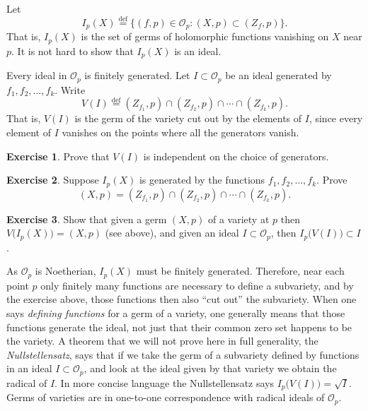 \documentclass[12pt,openany]{book}
\newcommand{\sO}{{\mathscr{O}}}
\newcommand{\myindex}[1]{#1\index{#1}}
\theoremstyle{plain}
\theoremstyle{remark}
\theoremstyle{definition}
\newenvironment{exbox}{%
    \def\FrameCommand{\vrule width 1pt \relax\hspace {10pt}}%
    \MakeFramed {\advance \hsize -\width \FrameRestore }%
}{%
    \endMakeFramed
}
\theoremstyle{exercise}
\newtheorem{exercise}{Exercise}[section]
\theoremstyle{example}
\begin{document}
Let
%
\begin{equation*}
I_p(X) \overset{\text{def}}{=}
\bigl\{ (f,p) \in \sO_p : (X,p) \subset (Z_f,p) \bigr\} .
\end{equation*}
That is, $I_p(X)$ is the set of germs of holomorphic functions vanishing on
$X$ near $p$.  It is not hard to show that $I_p(X)$ is an ideal.

Every ideal in $\sO_p$ is finitely generated.
Let $I \subset \sO_p$ be an ideal generated by $f_1,f_2,\ldots,f_k$.
Write
%
\begin{equation*}
V(I) \overset{\text{def}}{=}
(Z_{f_1},p) \cap (Z_{f_2},p) \cap \cdots \cap (Z_{f_k},p) .
\end{equation*}
That is, $V(I)$ is the germ of the variety cut out by the elements of $I$,
since every
element of $I$ vanishes on the points where all the generators vanish.

\begin{exbox}
\begin{exercise}
Prove that $V(I)$ is independent on the choice of generators.
\end{exercise}

\begin{exercise}
Suppose $I_p(X)$ is generated by the functions $f_1, f_2, \ldots, f_k$.
Prove 
\begin{equation*}
(X,p) = (Z_{f_1},p) \cap (Z_{f_2},p) \cap \cdots \cap (Z_{f_k},p) .
\end{equation*}
\end{exercise}

\begin{exercise}
Show that given a germ $(X,p)$ of a variety at $p$ then
$V\bigl(I_p(X)\bigr) = (X,p)$ (see above), and
given an ideal $I \subset \sO_p$, then
$I_p\bigl(V(I)\bigr) \subset I$.
\end{exercise}
\end{exbox}

As $\sO_p$ is Noetherian, $I_p(X)$ must be finitely
generated.  Therefore, near each point $p$ only finitely many functions are
necessary to define a subvariety, and by the exercise above, those functions 
then also ``cut out'' the subvariety.  When one says 
\emph{\myindex{defining functions}} for a germ of a variety, one generally
means that those functions generate the ideal, not just that their common
zero set happens to be the variety.  A theorem that we will not prove here
in full generality,
the \emph{\myindex{Nullstellensatz}}, says that if we take the germ of
a subvariety defined by functions
in an ideal $I \subset \sO_p$, and look at the ideal given by that variety we obtain the
radical of $I$.  In more concise language the Nullstellensatz says
$I_p\bigl(V(I)\bigr) = \sqrt{I}$.
Germs of varieties are in
one-to-one correspondence with radical ideals of $\sO_p$.
\end{document}
